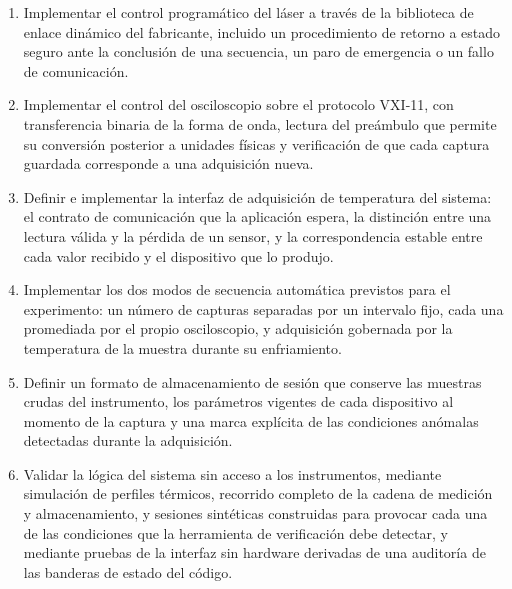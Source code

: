 \begin{enumerate}[label=\arabic*.]
  \item Implementar el control programático del láser a través de la
        biblioteca de enlace dinámico del fabricante, incluido un
        procedimiento de retorno a estado seguro ante la conclusión de
        una secuencia, un paro de emergencia o un fallo de
        comunicación.

  \item Implementar el control del osciloscopio sobre el protocolo
        VXI-11, con transferencia binaria de la forma de onda, lectura
        del preámbulo que permite su conversión posterior a unidades
        físicas y verificación de que cada captura guardada
        corresponde a una adquisición nueva.

  \item Definir e implementar la interfaz de adquisición de temperatura
        del sistema: el contrato de comunicación que la aplicación
        espera, la distinción entre una lectura válida y la pérdida de
        un sensor, y la correspondencia estable entre cada valor
        recibido y el dispositivo que lo produjo.

  \item Implementar los dos modos de secuencia automática previstos para
        el experimento: un número de capturas separadas por un intervalo
        fijo, cada una promediada por el propio osciloscopio, y
        adquisición gobernada por la temperatura de la muestra durante
        su enfriamiento.

  \item Definir un formato de almacenamiento de sesión que conserve las
        muestras crudas del instrumento, los parámetros vigentes de cada
        dispositivo al momento de la captura y una marca explícita de
        las condiciones anómalas detectadas durante la adquisición.

  \item Validar la lógica del sistema sin acceso a los instrumentos,
        mediante simulación de perfiles térmicos, recorrido completo de
        la cadena de medición y almacenamiento, y sesiones sintéticas
        construidas para provocar cada una de las condiciones que la
        herramienta de verificación debe detectar, y mediante pruebas
        de la interfaz sin hardware derivadas de una auditoría de las
        banderas de estado del código.
\end{enumerate}


